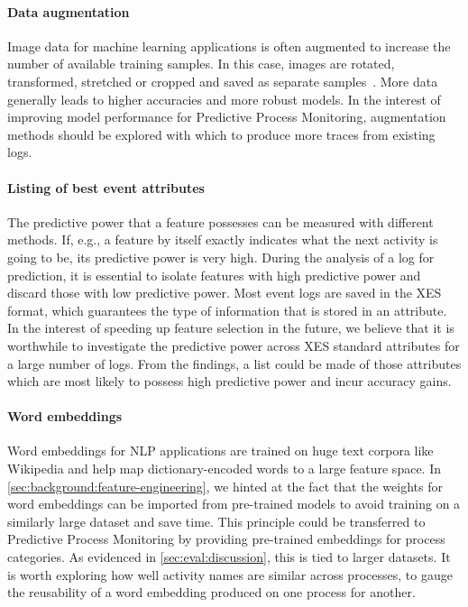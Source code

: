 \paragraph{Data augmentation} Image data for machine learning applications is often augmented to increase the number of available training samples.
In this case, images are rotated, transformed, stretched or cropped and saved as separate samples~\cite{Thoma:2017,}.
More data generally leads to higher accuracies and more robust models.
In the interest of improving model performance for Predictive Process Monitoring, augmentation methods should be explored with which to produce more traces from existing logs.

\paragraph{Listing of best event attributes} The predictive power that a feature possesses can be measured with different methods.
If, e.g., a feature by itself exactly indicates what the next activity is going to be, its predictive power is very high.
During the analysis of a log for prediction, it is essential to isolate features with high predictive power and discard those with low predictive power.
Most event logs are saved in the XES format, which guarantees the type of information that is stored in an attribute.
In the interest of speeding up feature selection in the future, we believe that it is worthwhile to investigate the predictive power across XES standard attributes for a large number of logs.
From the findings, a list could be made of those attributes which are most likely to possess high predictive power and incur accuracy gains.

\paragraph{Word embeddings} Word embeddings for NLP applications are trained on huge text corpora like Wikipedia and help map dictionary-encoded words to a large feature space.
In \autoref{sec:background:feature-engineering}, we hinted at the fact that the weights for word embeddings can be imported from pre-trained models to avoid training on a similarly large dataset and save time.
This principle could be transferred to Predictive Process Monitoring by providing pre-trained embeddings for process categories.
As evidenced in \autoref{sec:eval:discussion}, this is tied to larger datasets.
It is worth exploring how well activity names are similar across processes, to gauge the reusability of a word embedding produced on one process for another.

